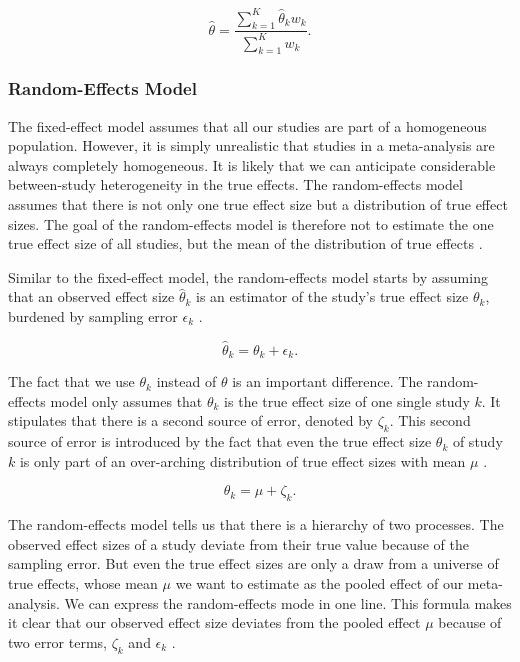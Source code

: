 \documentclass[../../../main.tex]{subfiles}
\begin{document}
\begin{equation}
\hat{\theta} = \frac{\sum_{k=1}^{K}\hat{\theta}_kw_k}{\sum_{k=1}^{K}w_k}.
\end{equation}

\subsubsection{Random-Effects Model}

The fixed-effect model assumes that all our studies are part of a homogeneous population. However, it is simply unrealistic that studies in a meta-analysis are always completely homogeneous. It is likely that we can anticipate considerable between-study heterogeneity in the true effects. The random-effects model assumes that there is not only one true effect size but a distribution of true effect sizes. The goal of the random-effects model is therefore not to estimate the one true effect size of all studies, but the mean of the distribution of true effects \autocite{Harrer2021}.

Similar to the fixed-effect model, the random-effects model starts by assuming that an observed effect size $\hat{\theta}_k$ is an estimator of the study's true effect size $\theta_k$, burdened by sampling error $\epsilon_k$ \autocite{Harrer2021}.

\begin{equation}
\hat{\theta}_k = \theta_k + \epsilon_k.
\end{equation}

The fact that we use $\theta_k$ instead of $\theta$ is an important difference. The random-effects model only assumes that $\theta_k$ is the true effect size of one single study $k$. It stipulates that there is a second source of error, denoted by $\zeta_k$. This second source of error is introduced by the fact that even the true effect size $\theta_k$ of study $k$ is only part of an over-arching distribution of true effect sizes with mean $\mu$ \autocite{Harrer2021}.

\begin{equation}
\theta_k = \mu + \zeta_k.
\end{equation}

The random-effects model tells us that there is a hierarchy of two processes. The observed effect sizes of a study deviate from their true value because of the sampling error. But even the true effect sizes are only a draw from a universe of true effects, whose mean $\mu$ we want to estimate as the pooled effect of our meta-analysis. We can express the random-effects mode in one line. This formula makes it clear that our observed effect size deviates from the pooled effect $\mu$ because of two error terms, $\zeta_k$ and $\epsilon_k$ \autocite{Harrer2021}.
\end{document}

